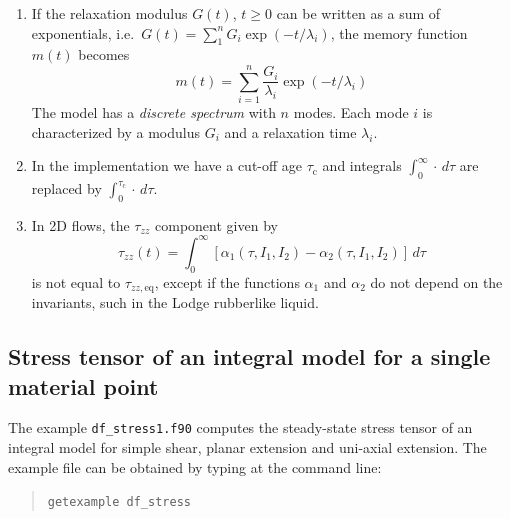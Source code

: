 \begin{enumerate}
\begin{equation}
\begin{split}
\end{split}
\end{equation}
which is a constant pressure term only. For the separable model, this becomes:
\begin{equation} 
\begin{split}
  \ten\tau_\text{eq} &= \int_0^{\infty}m(\tau)\,d\tau\,[h_1(3,3)-h_2(3,3)]\ten I\\
      &=- \int_0^{\infty}\deriv{G(\tau)}{\tau}\,d\tau\,[h_1(3,3)-h_2(3,3)]\ten I\\
      &= G(0)[h_1(3,3)-h_2(3,3)]\ten I
\end{split}
\end{equation}
where $\int_0^{\infty}-\lderiv{G(\tau)}{\tau}\,d\tau=G(0)-G(\infty)=G(0)$, since $G(\infty)=0$ for a fluid.

\item
If the relaxation modulus $G(t)$, $t\geq0$ 
can be written as a sum of exponentials, i.e.\ $G(t)=\sum_1^n G_i\exp(-t/\lambda_i)$, the memory function $m(t)$ becomes
\begin{equation}
   m(t)=\sum_{i=1}^n \frac{G_i}{\lambda_i}\exp(-t/\lambda_i)
   \label{eq:memexponentials}
\end{equation}
The model has a \emph{discrete spectrum} with $n$ modes. Each mode $i$ is characterized by a modulus $G_i$ and a relaxation time $\lambda_i$.
\item In the implementation we have a cut-off age $\tau_\text{c}$ and integrals $\int_0^\infty\cdot\, d\tau$ are replaced by 
$\int_0^{\tau_\text{c}}\cdot\, d\tau$.
\item In 2D flows, the $\tau_{zz}$ component given by
\begin{equation}
  \tau_{zz}(t) = \int_{0}^\infty[\alpha_1(\tau,I_1,I_2)-\alpha_2(\tau,I_1,I_2)]\,d\tau
\end{equation}
is not equal to $\tau_{{zz},\text{eq}}$, except if the functions $\alpha_1$ and $\alpha_2$ do not depend on the invariants, such in the Lodge rubberlike liquid.
\end{enumerate}

\subsection{Stress tensor of an integral model for a single material point}
\label{sec:df_stress_point}

The example \texttt{df\_stress1.f90} computes the steady-state stress tensor of an integral model for simple shear, planar extension and uni-axial extension.
The example file can be obtained by typing at the
command line:
\medskip
\begin{quote}
   \texttt{getexample df\_stress}
\end{quote}

